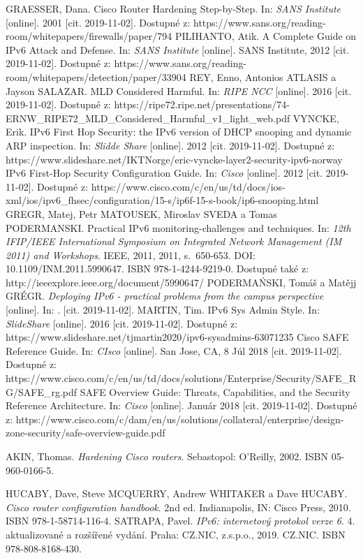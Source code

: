 \begin{literatura}{99}
GRAESSER, Dana. Cisco Router Hardening Step-by-Step. In: \textit{SANS Institute} [online]. 2001 [cit. 2019-11-02]. Dostupné z: https://www.sans.org/reading-room/whitepapers/firewalls/paper/794
PILIHANTO, Atik. A Complete Guide on IPv6 Attack and Defense. In: \textit{SANS Institute} [online]. SANS Institute, 2012 [cit. 2019-11-02]. Dostupné z: https://www.sans.org/reading-room/whitepapers/detection/paper/33904
REY, Enno, Antonios ATLASIS a Jayson SALAZAR. MLD Considered Harmful. In: \textit{RIPE NCC} [online]. 2016 [cit. 2019-11-02]. Dostupné z: https://ripe72.ripe.net/presentations/74-ERNW\_RIPE72\_MLD\_Considered\_Harmful\_v1\_light\_web.pdf
VYNCKE, Erik. IPv6 First Hop Security: the IPv6 version of DHCP snooping and dynamic ARP inspection. In: \textit{Slidde Share} [online]. 2012 [cit. 2019-11-02]. Dostupné z: https://www.slideshare.net/IKTNorge/eric-vyncke-layer2-security-ipv6-norway
IPv6 First-Hop Security Configuration Guide. In: \textit{Cisco} [online]. 2012 [cit. 2019-11-02]. Dostupné z: https://www.cisco.com/c/en/us/td/docs/ios-xml/ios/ipv6\_fhsec/configuration/15-s/ip6f-15-s-book/ip6-snooping.html
GREGR, Matej, Petr MATOUSEK, Miroslav SVEDA a Tomas PODERMANSKI. Practical IPv6 monitoring-challenges and techniques. In: \textit{12th IFIP/IEEE International Symposium on Integrated Network Management (IM 2011) and Workshops}. IEEE, 2011, 2011, s.~650-653. DOI: 10.1109/INM.2011.5990647. ISBN 978-1-4244-9219-0. Dostupné také z: http://ieeexplore.ieee.org/document/5990647/
PODERMAŃSKI, Tomáš a Matějj GRÉGR. \textit{Deploying IPv6 - practical problems from the campus perspective} [online]. In: . [cit. 2019-11-02].
MARTIN, Tim. IPv6 Sys Admin Style. In: \textit{SlideShare} [online]. 2016 [cit. 2019-11-02]. Dostupné z: https://www.slideshare.net/tjmartin2020/ipv6-sysadmins-63071235
Cisco SAFE Reference Guide. In: \textit{CIsco} [online]. San Jose, CA, 8 Júl 2018 [cit. 2019-11-02]. Dostupné z: https://www.cisco.com/c/en/us/td/docs/solutions/Enterprise/Security/SAFE\_RG/SAFE\_rg.pdf
SAFE Overview Guide: Threats, Capabilities, and the Security Reference Architecture. In: \textit{Cisco} [online]. Január 2018 [cit. 2019-11-02]. Dostupné z: https://www.cisco.com/c/dam/en/us/solutions/collateral/enterprise/design-zone-security/safe-overview-guide.pdf

AKIN, Thomas. \textit{Hardening Cisco routers}. Sebastopol: O'Reilly, 2002. ISBN 05-960-0166-5.

HUCABY, Dave, Steve MCQUERRY, Andrew WHITAKER a Dave HUCABY. \textit{Cisco router configuration handbook}. 2nd ed. Indianapolis, IN: Cisco Press, 2010. ISBN 978-1-58714-116-4.
SATRAPA, Pavel. \textit{IPv6: internetový protokol verze 6}. 4. aktualizované a rozšířené vydání. Praha: CZ.NIC, z.s.p.o., 2019. CZ.NIC. ISBN 978-808-8168-430.



\end{literatura}


